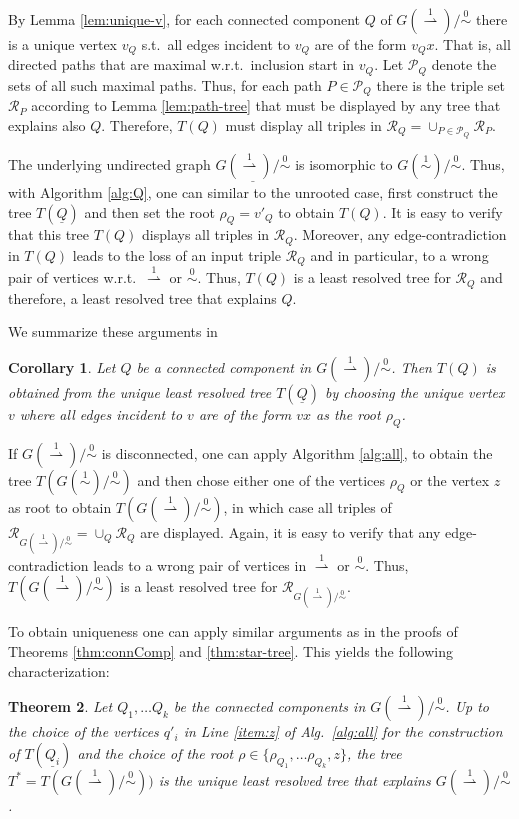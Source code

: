 \documentclass[smallextended]{svjour3}
\newcommand{\Ro}{\mathrel{\overset{0}{\sim}}}
\newcommand{\Rl}{\mathrel{\overset{1}{\sim}}}
\newcommand{\Rld}{\mathrel{\overset{1}{\rightharpoonup}}}
\newtheorem{thm}{Theorem}
\newtheorem{cor}[thm]{Corollary}
\begin{document}
By Lemma \ref{lem:unique-v}, for each connected component $Q$ of
$G(\Rld)/\Ro$ there is a unique vertex $v_Q$ s.t.\ all edges incident to
$v_Q$ are of the form $v_Qx$. That is, all directed paths that are maximal
w.r.t.\ inclusion start in $v_Q$.  Let $\mathcal P_Q$ denote the sets of
all such maximal paths.  Thus, for each path $P \in \mathcal P_Q$
there is the triple set $\mathcal{R}_{P}$ according to Lemma
\ref{lem:path-tree} that must be displayed by any tree that explains also
$Q$.  Therefore, $T(Q)$ must display all triples in $\mathcal{R}_Q =
\cup_{P\in \mathcal{P}_Q} \mathcal{R}_{P}$.

The underlying undirected graph $\underline{G(\Rld)/\Ro}$ is isomorphic to
$G(\Rl)/\Ro$. Thus, with Algorithm \ref{alg:Q}, one can similar to the
unrooted case, first construct the tree $T(\underline{Q})$ and then set the
root $\rho_Q=v'_Q$ to obtain $T(Q)$.  It is easy to verify that this tree
$T(Q)$ displays all triples in $\mathcal{R}_Q$.  Moreover, any
edge-contradiction in $T(Q)$ leads to the loss of an input triple
$\mathcal{R}_Q$ and in particular, to a wrong pair of vertices w.r.t.\
$\Rld$ or $\Ro$.  Thus, $T(Q)$ is a least resolved tree for
$\mathcal{R}_Q$ and therefore, a least resolved tree that explains $Q$.

We summarize these arguments in
\begin{cor} 
  Let $Q$ be a connected component in $G(\Rld)/\Ro$. Then $T(Q)$ is
  obtained from the unique least resolved tree $T(\underline{Q})$ by
  choosing the unique vertex $v$ where all edges incident to $v$ are of the
  form $vx$ as the root $\rho_Q$.
\label{cor:Q-root}
\end{cor}

If $G(\Rld)/\Ro$ is disconnected, one can apply Algorithm \ref{alg:all}, to
obtain the tree $T(G(\Rl)/\Ro)$ and then chose either one of the vertices
$\rho_Q$ or the vertex $z$ as root to obtain $T(G(\Rld)/\Ro)$, in which
case all triples of $\mathcal{R}_{G(\Rld)/\Ro} = \cup_Q \mathcal R_Q$ are
displayed. Again, it is easy to verify that any edge-contradiction leads to
a wrong pair of vertices in $\Rld$ or $\Ro$. Thus, $T(G(\Rld)/\Ro)$ is a
least resolved tree for $\mathcal{R}_{G(\Rld)/\Ro}$.

To obtain uniqueness one can apply similar arguments as in the proofs of
Theorems \ref{thm:connComp} and \ref{thm:star-tree}. This yields the
following characterization:

\begin{thm}
  Let $Q_1,\dots Q_k$ be the connected components in $G(\Rld)/\Ro$.  Up to
  the choice of the vertices $q'_i$ in Line \ref{item:z} of Alg.\
  \ref{alg:all} for the construction of $T(\underline{Q_i})$ and the choice
  of the root $\rho\in \{\rho_{Q_1},\ldots \rho_{Q_k}, z\}$, the tree $T^*
  = T(G(\Rld)/\Ro))$ is the unique least resolved tree that explains
  $G(\Rld)/\Ro$.
  \label{thm:star-tree-dir}
\end{thm}
\end{document}
